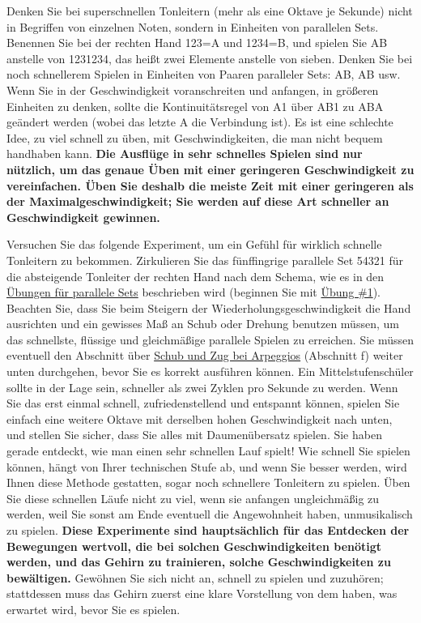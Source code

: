 Denken Sie bei superschnellen Tonleitern (mehr als eine Oktave je Sekunde) nicht in Begriffen von einzelnen Noten, sondern in Einheiten von parallelen Sets.
Benennen Sie bei der rechten Hand 123=A und 1234=B, und spielen Sie AB anstelle von 1231234, das heißt zwei Elemente anstelle von sieben.
Denken Sie bei noch schnellerem Spielen in Einheiten von Paaren paralleler Sets: AB, AB usw.
Wenn Sie in der Geschwindigkeit voranschreiten und anfangen, in größeren Einheiten zu denken, sollte die Kontinuitätsregel von A1 über AB1 zu ABA geändert werden (wobei das letzte A die Verbindung ist).
Es ist eine schlechte Idee, zu viel schnell zu üben, mit Geschwindigkeiten, die man nicht bequem handhaben kann.
\textbf{Die Ausflüge in sehr schnelles Spielen sind nur nützlich, um das genaue Üben mit einer geringeren Geschwindigkeit zu vereinfachen.
Üben Sie deshalb die meiste Zeit mit einer geringeren als der Maximalgeschwindigkeit; Sie werden auf diese Art schneller an Geschwindigkeit gewinnen.}

Versuchen Sie das folgende Experiment, um ein Gefühl für wirklich schnelle Tonleitern zu bekommen.
Zirkulieren Sie das fünffingrige parallele Set 54321 für die absteigende Tonleiter der rechten Hand nach dem Schema, wie es in den \hyperref[c1iii7b]{Übungen für parallele Sets} beschrieben wird (beginnen Sie mit \hyperref[c1iii7b1]{Übung \#1}).
Beachten Sie, dass Sie beim Steigern der Wiederholungsgeschwindigkeit die Hand ausrichten und ein gewisses Maß an Schub oder Drehung benutzen müssen, um das schnellste, flüssige und gleichmäßige parallele Spielen zu erreichen.
Sie müssen eventuell den Abschnitt über \hyperref[c1iii5SchubZug]{Schub und Zug bei Arpeggios} (Abschnitt f) weiter unten durchgehen, bevor Sie es korrekt ausführen können.
Ein Mittelstufenschüler sollte in der Lage sein, schneller als zwei Zyklen pro Sekunde zu werden.
Wenn Sie das erst einmal schnell, zufriedenstellend und entspannt können, spielen Sie einfach eine weitere Oktave mit derselben hohen Geschwindigkeit nach unten, und stellen Sie sicher, dass Sie alles mit Daumenübersatz spielen.
Sie haben gerade entdeckt, wie man einen sehr schnellen Lauf spielt!
Wie schnell Sie spielen können, hängt von Ihrer technischen Stufe ab, und wenn Sie besser werden, wird Ihnen diese Methode gestatten, sogar noch schnellere Tonleitern zu spielen.
Üben Sie diese schnellen Läufe nicht zu viel, wenn sie anfangen ungleichmäßig zu werden, weil Sie sonst am Ende eventuell die Angewohnheit haben, unmusikalisch zu spielen.
\textbf{Diese Experimente sind hauptsächlich für das Entdecken der Bewegungen wertvoll, die bei solchen Geschwindigkeiten benötigt werden, und das Gehirn zu trainieren, solche Geschwindigkeiten zu bewältigen.}
Gewöhnen Sie sich nicht an, schnell zu spielen und zuzuhören; stattdessen muss das Gehirn zuerst eine klare Vorstellung von dem haben, was erwartet wird, bevor Sie es spielen.

